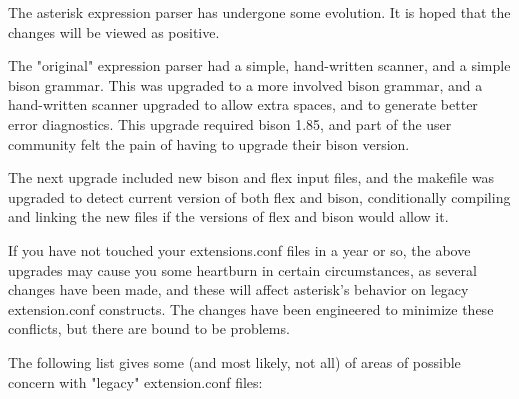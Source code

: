 The asterisk expression parser has undergone some evolution. It is hoped
that the changes will be viewed as positive. 

The "original" expression parser had a simple, hand-written scanner,
and a simple bison grammar. This was upgraded to a more involved bison
grammar, and a hand-written scanner upgraded to allow extra spaces,
and to generate better error diagnostics. This upgrade required bison
1.85, and part of the user community felt the pain of having to
upgrade their bison version.

The next upgrade included new bison and flex input files, and the makefile
was upgraded to detect current version of both flex and bison, conditionally
compiling and linking the new files if the versions of flex and bison would
allow it.

If you have not touched your extensions.conf files in a year or so, the
above upgrades may cause you some heartburn in certain circumstances, as
several changes have been made, and these will affect asterisk's behavior on 
legacy extension.conf constructs.  The changes have been engineered
to minimize these conflicts, but there are bound to be problems.

The following list gives some (and most likely, not all) of areas
of possible concern with "legacy" extension.conf files:


